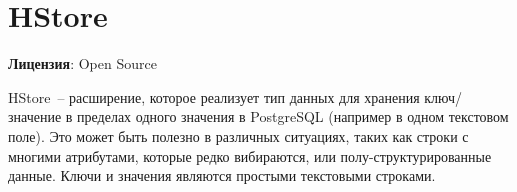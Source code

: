 \section{HStore}
\textbf{Лицензия}: Open Source

HStore~-- расширение, которое реализует тип данных для хранения ключ/значение в пределах одного значения в PostgreSQL (например в одном текстовом поле). Это может быть полезно в различных ситуациях, таких как строки с многими атрибутами, которые редко вибираются, или полу-структурированные данные. Ключи и значения являются простыми текстовыми строками.